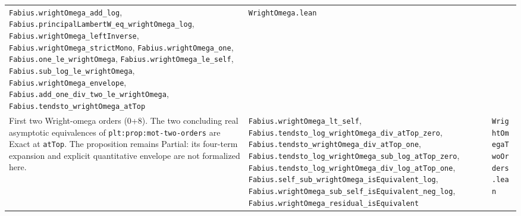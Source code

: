 \documentclass[11pt,oneside]{article}
\theoremstyle{definition}
\theoremstyle{remark}
\begin{document}
\begin{longtable}{@{}p{}p{}p{}@{}}
\nolinkurl{Fabius.wrightOmega_add_log},
\nolinkurl{Fabius.principalLambertW_eq_wrightOmega_log},
\nolinkurl{Fabius.wrightOmega_leftInverse},
\nolinkurl{Fabius.wrightOmega_strictMono},
\nolinkurl{Fabius.wrightOmega_one},
\nolinkurl{Fabius.one_le_wrightOmega},
\nolinkurl{Fabius.wrightOmega_le_self},
\nolinkurl{Fabius.sub_log_le_wrightOmega},
\nolinkurl{Fabius.wrightOmega_envelope},
\nolinkurl{Fabius.add_one_div_two_le_wrightOmega},
\nolinkurl{Fabius.tendsto_wrightOmega_atTop} &
\nolinkurl{WrightOmega.lean} \\
First two Wright-omega orders (0+8).  The two concluding real asymptotic
equivalences of \nolinkurl{plt:prop:mot-two-orders} are Exact at
\nolinkurl{atTop}.  The proposition remains Partial: its four-term expansion
and explicit quantitative envelope are not formalized here. &
\nolinkurl{Fabius.wrightOmega_lt_self},
\nolinkurl{Fabius.tendsto_log_wrightOmega_div_atTop_zero},
\nolinkurl{Fabius.tendsto_wrightOmega_div_atTop_one},
\nolinkurl{Fabius.tendsto_log_wrightOmega_sub_log_atTop_zero},
\nolinkurl{Fabius.tendsto_log_wrightOmega_div_log_atTop_one},
\nolinkurl{Fabius.self_sub_wrightOmega_isEquivalent_log},
\nolinkurl{Fabius.wrightOmega_sub_self_isEquivalent_neg_log},
\nolinkurl{Fabius.wrightOmega_residual_isEquivalent} &
\nolinkurl{WrightOmegaTwoOrders.lean} \\
\bottomrule
\end{longtable}
\end{document}
